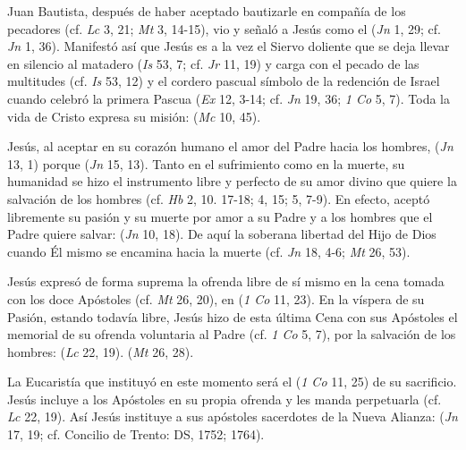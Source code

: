 \begin{ccebody}
 Juan Bautista, después de haber aceptado bautizarle en compañía de los pecadores (cf. \textit{Lc} 3, 21; \textit{Mt} 3, 14-15), vio y señaló a Jesús como el  (\textit{Jn} 1, 29; cf. \textit{Jn} 1, 36). Manifestó así que Jesús es a la vez el Siervo doliente que se deja llevar en silencio al matadero (\textit{Is} 53, 7; cf. \textit{Jr} 11, 19) y carga con el pecado de las multitudes (cf. \textit{Is} 53, 12) y el cordero pascual símbolo de la redención de Israel cuando celebró la primera Pascua (\textit{Ex} 12, 3-14; cf. \textit{Jn} 19, 36; \textit{1 Co} 5, 7). Toda la vida de Cristo expresa su misión:  (\textit{Mc} 10, 45).


 Jesús, al aceptar en su corazón humano el amor del Padre hacia los hombres,  (\textit{Jn} 13, 1) porque  (\textit{Jn} 15, 13). Tanto en el sufrimiento como en la muerte, su humanidad se hizo el instrumento libre y perfecto de su amor divino que quiere la salvación de los hombres (cf. \textit{Hb} 2, 10. 17-18; 4, 15; 5, 7-9). En efecto, aceptó libremente su pasión y su muerte por amor a su Padre y a los hombres que el Padre quiere salvar:  (\textit{Jn} 10, 18). De aquí la soberana libertad del Hijo de Dios cuando Él mismo se encamina hacia la muerte (cf. \textit{Jn} 18, 4-6; \textit{Mt} 26, 53).



 Jesús expresó de forma suprema la ofrenda libre de sí mismo en la cena tomada con los doce Apóstoles (cf. \textit{Mt} 26, 20), en  (\textit{1 Co} 11, 23). En la víspera de su Pasión, estando todavía libre, Jesús hizo de esta última Cena con sus Apóstoles el memorial de su ofrenda voluntaria al Padre (cf. \textit{1 Co} 5, 7), por la salvación de los hombres:  (\textit{Lc} 22, 19).  (\textit{Mt} 26, 28).

 La Eucaristía que instituyó en este momento será el  (\textit{1 Co} 11, 25) de su sacrificio. Jesús incluye a los Apóstoles en su propia ofrenda y les manda perpetuarla (cf. \textit{Lc} 22, 19). Así Jesús instituye a sus apóstoles sacerdotes de la Nueva Alianza:  (\textit{Jn} 17, 19; cf. Concilio de Trento: DS, 1752; 1764).


\end{ccebody}
